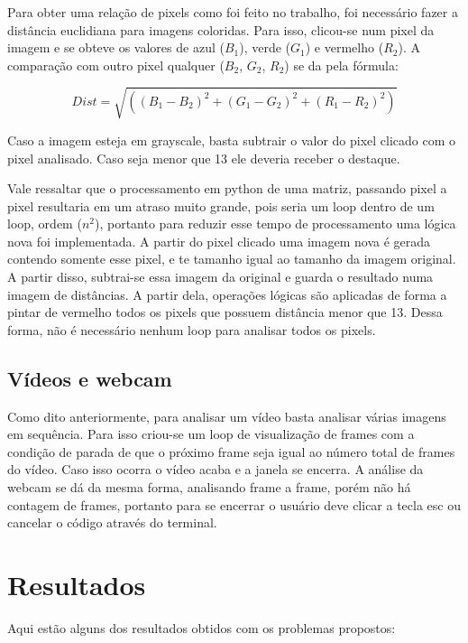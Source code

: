 \documentclass{bmvc2k}
\begin{document}
Para obter uma relação de pixels como foi feito no trabalho, foi necessário fazer a distância euclidiana para imagens coloridas. Para isso, clicou-se num pixel da imagem e se obteve os valores de azul ($B_1$), verde ($G_1$) e vermelho ($R_2$). A comparação com outro pixel qualquer ($B_2$, $G_2$, $R_2$) se da pela fórmula:

\begin{equation}
    Dist = \sqrt{((B_1 - B_2)^2 + (G_1 - G_2)^2 + (R_1 - R_2)^2)}
\end{equation}

Caso a imagem esteja em grayscale, basta subtrair o valor do pixel clicado com o pixel analisado. Caso seja menor que 13 ele deveria receber o destaque.

Vale ressaltar que o processamento em python de uma matriz, passando pixel a pixel resultaria em um atraso muito grande, pois seria um loop dentro de um loop, ordem ($n^2$), portanto para reduzir esse tempo de processamento uma lógica nova foi implementada. A partir do pixel clicado uma imagem nova é gerada contendo somente esse pixel, e te tamanho igual ao tamanho da imagem original. A partir disso, subtrai-se essa imagem da original e guarda o resultado numa imagem de distâncias. A partir dela, operações lógicas são aplicadas de forma a pintar de vermelho todos os pixels que possuem distância menor que 13. Dessa forma, não é necessário nenhum loop para analisar todos os pixels.

\cite{threshold}
\cite{noloop}
\cite{MatForImage}

\subsection{Vídeos e webcam}
Como dito anteriormente, para analisar um vídeo basta analisar várias imagens em sequência. Para isso criou-se um loop de visualização de frames com a condição de parada de que o próximo frame seja igual ao número total de frames do vídeo. Caso isso ocorra o vídeo acaba e a janela se encerra.
A análise da webcam se dá da mesma forma, analisando frame a frame, porém não há contagem de frames, portanto para se encerrar o usuário deve clicar a tecla esc ou cancelar o código através do terminal.

\section{Resultados}
Aqui estão alguns dos resultados obtidos com os problemas propostos:
\end{document}
